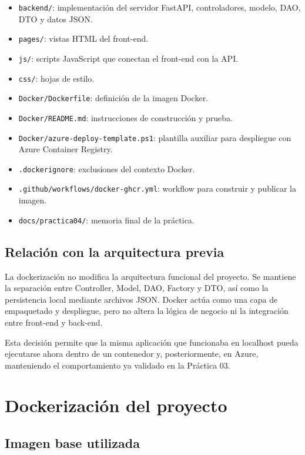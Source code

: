 \documentclass[11pt,a4paper]{article}
\begin{document}
\begin{itemize}
  \item \texttt{backend/}: implementaci\'on del servidor FastAPI, controladores, modelo, DAO, DTO y datos JSON.
  \item \texttt{pages/}: vistas HTML del front-end.
  \item \texttt{js/}: scripts JavaScript que conectan el front-end con la API.
  \item \texttt{css/}: hojas de estilo.
  \item \texttt{Docker/Dockerfile}: definici\'on de la imagen Docker.
  \item \texttt{Docker/README.md}: instrucciones de construcci\'on y prueba.
  \item \texttt{Docker/azure-deploy-template.ps1}: plantilla auxiliar para despliegue con Azure Container Registry.
  \item \texttt{.dockerignore}: exclusiones del contexto Docker.
  \item \texttt{.github/workflows/docker-ghcr.yml}: workflow para construir y publicar la imagen.
  \item \texttt{docs/practica04/}: memoria final de la pr\'actica.
\end{itemize}

\subsection{Relaci\'on con la arquitectura previa}

La dockerizaci\'on no modifica la arquitectura funcional del proyecto. Se mantiene la separaci\'on entre Controller, Model, DAO, Factory y DTO, as\'i como la persistencia local mediante archivos JSON. Docker act\'ua como una capa de empaquetado y despliegue, pero no altera la l\'ogica de negocio ni la integraci\'on entre front-end y back-end.

Esta decisi\'on permite que la misma aplicaci\'on que funcionaba en localhost pueda ejecutarse ahora dentro de un contenedor y, posteriormente, en Azure, manteniendo el comportamiento ya validado en la Pr\'actica 03.

\section{Dockerizaci\'on del proyecto}

\subsection{Imagen base utilizada}
\end{document}
